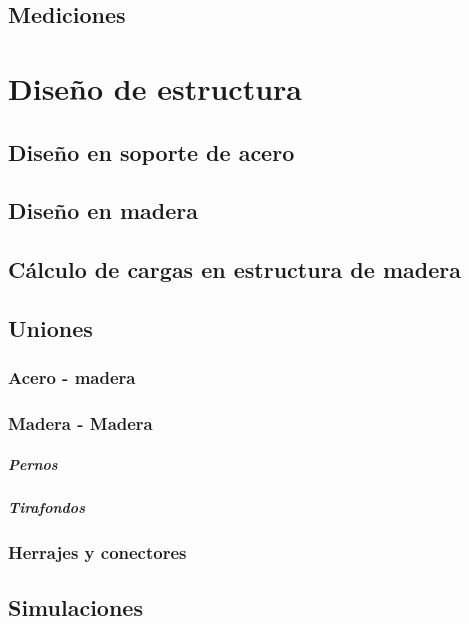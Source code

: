 \subsection{Mediciones}

\section{Diseño de estructura}
\subsection{Diseño en soporte de acero}

\subsection{Diseño en madera}

\subsection{Cálculo de cargas en estructura de madera}

\subsection{Uniones}
\subsubsection{Acero - madera}
\subsubsection{Madera - Madera}
\subparagraph{Pernos}
\subparagraph{Tirafondos}
\subsubsection{Herrajes y conectores}

\subsection{Simulaciones}
